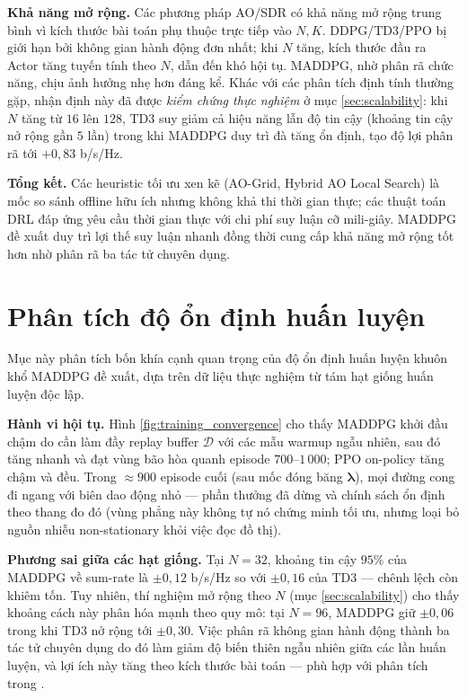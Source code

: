 \textbf{Khả năng mở rộng.} Các phương pháp AO/SDR có khả năng mở rộng
trung bình vì kích thước bài toán phụ thuộc trực tiếp vào $N, K$. DDPG/TD3/PPO bị
giới hạn bởi không gian hành động đơn nhất; khi $N$ tăng, kích thước
đầu ra Actor tăng tuyến tính theo $N$, dẫn đến khó hội tụ. MADDPG,
nhờ phân rã chức năng, chịu ảnh hưởng nhẹ hơn đáng kể. Khác với các
phân tích định tính thường gặp, nhận định này đã được \emph{kiểm
chứng thực nghiệm} ở mục \ref{sec:scalability}: khi $N$ tăng từ $16$
lên $128$, TD3 suy giảm cả hiệu năng lẫn độ tin cậy (khoảng tin cậy
nở rộng gần $5$ lần) trong khi MADDPG duy trì đà tăng ổn định, tạo
độ lợi phân rã tới $+0{,}83$ b/s/Hz.

\textbf{Tổng kết.} Các heuristic tối ưu xen kẽ (AO-Grid, Hybrid AO
Local Search) là mốc so sánh offline hữu ích nhưng không khả thi thời
gian thực; các thuật toán DRL đáp ứng yêu cầu thời gian thực với chi
phí suy luận cỡ mili-giây. MADDPG đề xuất duy trì lợi thế suy luận
nhanh đồng thời cung cấp khả năng mở rộng tốt hơn nhờ phân rã ba tác
tử chuyên dụng.

\section{Phân tích độ ổn định huấn luyện}
\label{sec:stability_analysis}

Mục này phân tích bốn khía cạnh quan trọng của độ ổn định huấn luyện
khuôn khổ MADDPG đề xuất, dựa trên dữ liệu thực nghiệm từ tám hạt giống
huấn luyện độc lập.

\textbf{Hành vi hội tụ.} Hình \ref{fig:training_convergence} cho thấy
MADDPG khởi đầu chậm do cần làm đầy replay buffer $\mathcal{D}$ với
các mẫu warmup ngẫu nhiên, sau đó tăng nhanh và đạt vùng bão hòa quanh
episode $700$--$1\,000$; PPO on-policy tăng chậm và đều. Trong
$\approx 900$ episode cuối (sau mốc đóng băng $\boldsymbol{\lambda}$),
mọi đường cong đi ngang với biên dao động nhỏ --- phần thưởng đã dừng
và chính sách ổn định theo thang đo đó (vùng phẳng này không tự nó
chứng minh tối ưu, nhưng loại bỏ nguồn nhiễu non-stationary khỏi việc
đọc đồ thị).

\textbf{Phương sai giữa các hạt giống.} Tại $N=32$, khoảng tin cậy
$95\%$ của MADDPG về sum-rate là $\pm 0{,}12$ b/s/Hz so với
$\pm 0{,}16$ của TD3 --- chênh lệch còn khiêm tốn. Tuy nhiên, thí
nghiệm mở rộng theo $N$ (mục \ref{sec:scalability}) cho thấy khoảng
cách này phân hóa mạnh theo quy mô: tại $N=96$, MADDPG giữ
$\pm 0{,}06$ trong khi TD3 nở rộng tới $\pm 0{,}30$. Việc phân rã
không gian hành động thành ba tác tử chuyên dụng do đó làm giảm độ
biến thiên ngẫu nhiên giữa các lần huấn luyện, và lợi ích này tăng
theo kích thước bài toán --- phù hợp với phân tích trong
\cite{lowe2017multi}.

